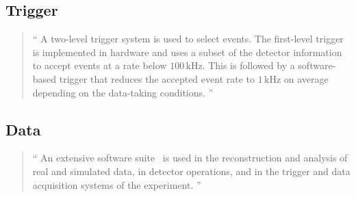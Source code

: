 \subsection{Trigger}
\label{sec:atlas_trigger}
\begin{quote}
``%
A two-level trigger system is used to select events.
The first-level trigger is implemented in hardware and uses a subset of the
detector information to accept events at a rate below $100\,\mathrm{kHz}$.
This is followed by a software-based trigger that reduces the accepted event
rate to $1\,\mathrm{kHz}$ on average depending on the data-taking conditions.%
''~\cite{atlas2022searches}
\end{quote}


\subsection{Data}
\label{sec:atlas_data}
\begin{quote}
``%
An extensive software suite~\cite{ATL-SOFT-PUB-2021-001} is used in the
reconstruction and analysis of real and simulated data, in detector operations,
and in the trigger and data acquisition systems of the experiment.%
''~\cite{atlas2022searches}
\end{quote}



